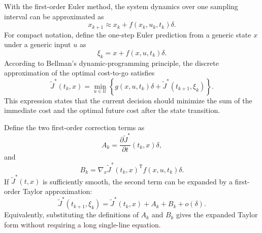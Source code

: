 \documentclass[11pt]{article}
\begin{document}
With the first-order Euler method, the system dynamics over one sampling interval can be approximated as
\begin{equation}
x_{k+1}\approx x_k+f(x_k,u_k,t_k)\delta.
\label{eq:euler_step}
\end{equation}
For compact notation, define the one-step Euler prediction from a generic state $x$ under a generic input $u$ as
\begin{equation}
\xi_k=x+f(x,u,t_k)\delta.
\label{eq:euler_prediction}
\end{equation}
According to Bellman's dynamic-programming principle, the discrete approximation of the optimal cost-to-go satisfies
\begin{equation}
\widetilde{J}^{*}(t_k,x)
=
\min_{u\in\mathcal{U}}
\left\{
 g(x,u,t_k)\delta
 +\widetilde{J}^{*}(t_{k+1},\xi_k)
\right\}.
\label{eq:discrete_bellman_derivation}
\end{equation}
This expression states that the current decision should minimize the sum of the immediate cost and the optimal future cost after the state transition.

Define the two first-order correction terms as
\begin{equation}
A_k=
\frac{\partial \widetilde{J}^{*}}{\partial t}(t_k,x)\delta,
\label{eq:Ak}
\end{equation}
and
\begin{equation}
B_k=
\nabla_x\widetilde{J}^{*}(t_k,x)^{\mathsf T}f(x,u,t_k)\delta.
\label{eq:Bk}
\end{equation}
If $\widetilde{J}^{*}(t,x)$ is sufficiently smooth, the second term can be expanded by a first-order Taylor approximation:
\begin{equation}
\widetilde{J}^{*}(t_{k+1},\xi_k)
=
\widetilde{J}^{*}(t_k,x)+A_k+B_k+o(\delta).
\label{eq:taylor_value}
\end{equation}
Equivalently, substituting the definitions of $A_k$ and $B_k$ gives the expanded Taylor form without requiring a long single-line equation.
\end{document}
